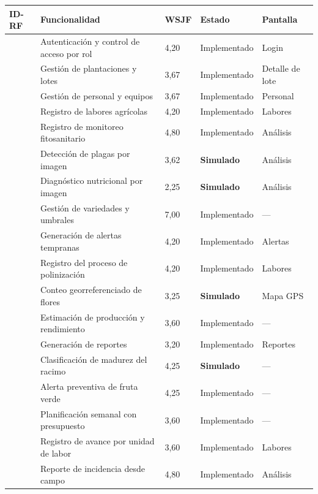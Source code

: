 \footnotesize
\begin{longtable}{|C{1.4cm}|L{5.6cm}|C{1.4cm}|C{2.6cm}|L{3.4cm}|}
\hline
{}\textbf{ID-RF} & \textbf{Funcionalidad} & \textbf{WSJF} & \textbf{Estado} & \textbf{Pantalla} \\
\hline
\endhead
{} & Autenticación y control de acceso por rol & 4,20 & Implementado & Login \\ \hline
{} & Gestión de plantaciones y lotes & 3,67 & Implementado & Detalle de lote \\ \hline
{} & Gestión de personal y equipos & 3,67 & Implementado & Personal \\ \hline
{} & Registro de labores agrícolas & 4,20 & Implementado & Labores \\ \hline
{} & Registro de monitoreo fitosanitario & 4,80 & Implementado & Análisis \\ \hline
{} & Detección de plagas por imagen & 3,62 & \textbf{Simulado} & Análisis \\ \hline
{} & Diagnóstico nutricional por imagen & 2,25 & \textbf{Simulado} & Análisis \\ \hline
{} & Gestión de variedades y umbrales & 7,00 & Implementado & --- \\ \hline
{} & Generación de alertas tempranas & 4,20 & Implementado & Alertas \\ \hline
{} & Registro del proceso de polinización & 4,20 & Implementado & Labores \\ \hline
{} & Conteo georreferenciado de flores & 3,25 & \textbf{Simulado} & Mapa GPS \\ \hline
{} & Estimación de producción y rendimiento & 3,60 & Implementado & --- \\ \hline
{} & Generación de reportes & 3,20 & Implementado & Reportes \\ \hline
{} & Clasificación de madurez del racimo & 4,25 & \textbf{Simulado} & --- \\ \hline
{} & Alerta preventiva de fruta verde & 4,25 & Implementado & --- \\ \hline
{} & Planificación semanal con presupuesto & 3,60 & Implementado & --- \\ \hline
{} & Registro de avance por unidad de labor & 3,60 & Implementado & Labores \\ \hline
{} & Reporte de incidencia desde campo & 4,80 & Implementado & Análisis \\ \hline

\end{longtable}

